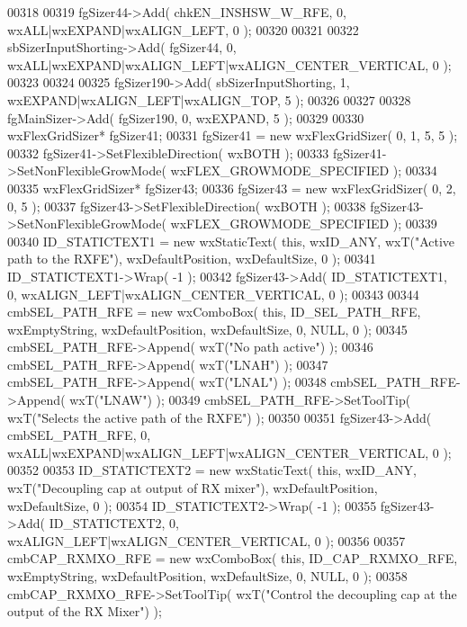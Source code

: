 \begin{DoxyCode}
00318     
00319     fgSizer44->Add( chkEN_INSHSW_W_RFE, 0, wxALL|wxEXPAND|wxALIGN\_LEFT, 0 );
00320     
00321     
00322     sbSizerInputShorting->Add( fgSizer44, 0, wxALL|wxEXPAND|wxALIGN\_LEFT|wxALIGN\_CENTER\_VERTICAL, 0 );
00323     
00324     
00325     fgSizer190->Add( sbSizerInputShorting, 1, wxEXPAND|wxALIGN\_LEFT|wxALIGN\_TOP, 5 );
00326     
00327     
00328     fgMainSizer->Add( fgSizer190, 0, wxEXPAND, 5 );
00329     
00330     wxFlexGridSizer* fgSizer41;
00331     fgSizer41 = \textcolor{keyword}{new} wxFlexGridSizer( 0, 1, 5, 5 );
00332     fgSizer41->SetFlexibleDirection( wxBOTH );
00333     fgSizer41->SetNonFlexibleGrowMode( wxFLEX\_GROWMODE\_SPECIFIED );
00334     
00335     wxFlexGridSizer* fgSizer43;
00336     fgSizer43 = \textcolor{keyword}{new} wxFlexGridSizer( 0, 2, 0, 5 );
00337     fgSizer43->SetFlexibleDirection( wxBOTH );
00338     fgSizer43->SetNonFlexibleGrowMode( wxFLEX\_GROWMODE\_SPECIFIED );
00339     
00340     ID_STATICTEXT1 = \textcolor{keyword}{new} wxStaticText( \textcolor{keyword}{this}, wxID\_ANY, wxT(\textcolor{stringliteral}{"Active path to the RXFE"}), wxDefaultPosition, 
      wxDefaultSize, 0 );
00341     ID_STATICTEXT1->Wrap( -1 );
00342     fgSizer43->Add( ID_STATICTEXT1, 0, wxALIGN\_LEFT|wxALIGN\_CENTER\_VERTICAL, 0 );
00343     
00344     cmbSEL_PATH_RFE = \textcolor{keyword}{new} wxComboBox( \textcolor{keyword}{this}, ID_SEL_PATH_RFE, wxEmptyString, wxDefaultPosition, 
      wxDefaultSize, 0, NULL, 0 );
00345     cmbSEL_PATH_RFE->Append( wxT(\textcolor{stringliteral}{"No path active"}) );
00346     cmbSEL_PATH_RFE->Append( wxT(\textcolor{stringliteral}{"LNAH"}) );
00347     cmbSEL_PATH_RFE->Append( wxT(\textcolor{stringliteral}{"LNAL"}) );
00348     cmbSEL_PATH_RFE->Append( wxT(\textcolor{stringliteral}{"LNAW"}) );
00349     cmbSEL_PATH_RFE->SetToolTip( wxT(\textcolor{stringliteral}{"Selects the active path of the RXFE"}) );
00350     
00351     fgSizer43->Add( cmbSEL_PATH_RFE, 0, wxALL|wxEXPAND|wxALIGN\_LEFT|wxALIGN\_CENTER\_VERTICAL, 0 );
00352     
00353     ID_STATICTEXT2 = \textcolor{keyword}{new} wxStaticText( \textcolor{keyword}{this}, wxID\_ANY, wxT(\textcolor{stringliteral}{"Decoupling cap at output of RX mixer"}), 
      wxDefaultPosition, wxDefaultSize, 0 );
00354     ID_STATICTEXT2->Wrap( -1 );
00355     fgSizer43->Add( ID_STATICTEXT2, 0, wxALIGN\_LEFT|wxALIGN\_CENTER\_VERTICAL, 0 );
00356     
00357     cmbCAP_RXMXO_RFE = \textcolor{keyword}{new} wxComboBox( \textcolor{keyword}{this}, ID_CAP_RXMXO_RFE, wxEmptyString, wxDefaultPosition, 
      wxDefaultSize, 0, NULL, 0 ); 
00358     cmbCAP_RXMXO_RFE->SetToolTip( wxT(\textcolor{stringliteral}{"Control the decoupling cap at the output of the RX Mixer"}) );

\end{DoxyCode}
